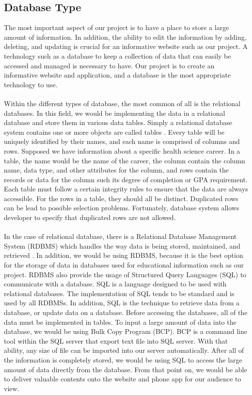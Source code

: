\documentclass[letterpaper,10pt, draftclsnofoot,onecolumn]{IEEEtran}
\begin{document}
{{\subsection[Database Type]{\noindent\color{black}
Database Type}
{\noindent\color{black}
The most important aspect of our project is to have a place to store a large amount of information.
In addition, the ability to edit the information by adding, deleting, and updating is crucial for an informative website such as our project. 
A technology such as a database to keep a collection of data that can easily be accessed and managed is necessary to have.
Our project is to create an informative website and application, and a database is the most appropriate technology to use. 
\\ \\
\noindent Within the different types of database, the most common of all is the relational databases.
In this field, we would be implementing the data in a relational database and store them in various data tables. 
Simply a relational database system contains one or more objects are called tables \cite{website2}. 
Every table will be uniquely identified by their names, and each name is comprised of columns and rows.
Supposed we have information about a specific health science career. 
In a table, the name would be the name of the career, the column contain the column name, data type, and other attributes for the column, and rows contain the records or data for the column such its degree of completion or GPA requirement. 
Each table must follow a certain integrity rules to ensure that the data are always accessible. 
For the rows in a table, they should all be distinct. 
Duplicated rows can be lead to possible selection problems. 
Fortunately, database system allows developer to specify that duplicated rows are not allowed. 
\\	\\
\noindent In the case of relational database, there is a Relational Database Management System (RDBMS) which handles the way data is being stored, maintained, and retrieved \cite{website2}. 
In addition, we would be using RDBMS, because it is the best option for the storage of data in databases used for educational information such as our project. 
RDBMS also provide the usage of Structured Query Languages (SQL) to communicate with a database. 
SQL is a language designed to be used with relational databases.
The implementation of SQL tends to be standard and is used by all RDBMSs.
In addition, SQL is the technique to retrieve data from a database, or update data on a database. 
Before accessing the databases, all of the data must be implemented in tables. 
To input a large amount of data into the database, we would be using Bulk Copy Program (BCP). BCP is a command line tool within the SQL server that export text file into SQL server. 
With that ability, any size of file can be imported into our server automatically. 
After all of the information is completely stored, we would be using SQL to access the large amount of data directly from the database. 
From that point on, we would be able to deliver valuable contents onto the website and phone app for our audience to view. 
}

}}
\end{document}
